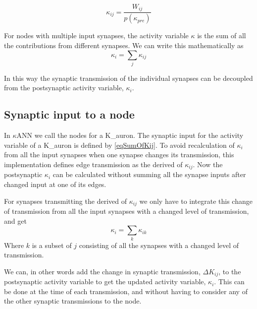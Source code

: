 			\begin{equation}
				\label{eqSynapticTransmissionForKANN}
				\kappa_{ij} = \frac{ W_{ij} }{ p(\kappa_{pre})}
			\end{equation}

			For nodes with multiple input synapses, the activity variable $\kappa$ is the sum of all the contributions from different synapses. %
			We can write this mathematically as 
			\begin{equation}
				\label{eqSumOfKij}
				\kappa_i = \sum_j{\kappa_{ij}}
			\end{equation}

			In this way the synaptic transmission of the individual synapses can be decoupled from the postsynaptic activity variable, $\kappa_i$.
			
		\subsection{Synaptic input to a node}
			\label{ssecSynInputToANode}
			In $\kappa$ANN we call the nodes for a K\_auron.
			The synaptic input for the activity variable of a K\_auron is defined by \eqref{eqSumOfKij}.
			To avoid recalculation of $\kappa_i$ from all the input synapses when one synapse changes its transmission, this implementation defines edge transmission as the derived of $\kappa_{ij}$.
			Now the postsynaptic $\kappa_i$ can be calculated without summing all the synapse inputs after changed input at one of its edges.

			For synapses transmitting the derived of $\kappa_{ij}$ we only have to integrate this change of transmission from all the input synapses with a changed level of transmission, and get
			\begin{equation}
				\kappa_i = \sum_k{\kappa_{ik}}
			\end{equation}
			Where ${k}$ is a subset of ${j}$ consisting of all the synapses with a changed level of transmission.

			We can, in other words add the change in synaptic transmission, $\Delta K_{ij}$, to the postsynaptic activity variable to get the updated activity variable, $\kappa_i$.
			This can be done at the time of each transmission, and without having to consider any of the other synaptic transmissions to the node.
			
